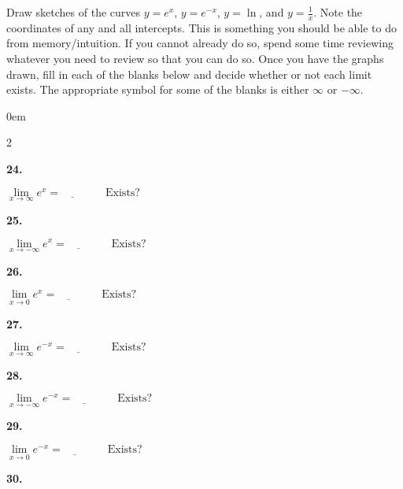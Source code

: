 \documentclass[12pt,]{book}
\theoremstyle{plain}
\theoremstyle{definition}
\numberwithin{equation}{section}
\newenvironment{exercisegroup}%
{\medskip\noindent}%
{\par\bigskip}%
\newlength{\exercisegroupindent}%
\newlength{\exercisegroupitemwidth}%
\newenvironment{exercisegrouplist}%
{\vspace{-\partopsep}%
\begin{adjustwidth}{\exercisegroupindent}{0em}}%
{\end{adjustwidth}%
\vspace{-\partopsep}%
\vspace{\baselineskip}}%
\newenvironment{exercisegroupbycol}[1]%
{\begin{exercisegrouplist}%
\vspace{-\multicolsep}%
\begin{multicols}{#1}%
\setlength{\parindent}{0em}%
\setlength{\exercisegroupitemwidth}{\linewidth}}%
{\end{multicols}%
\vspace{-\multicolsep}%
\end{exercisegrouplist}}%
\newenvironment{exercisegroupitem}[1]%
{\begin{minipage}[t]{\exercisegroupitemwidth}
\vspace{0pt}%
{\bfseries#1}%
\rule{0pt}{\baselineskip}}{\strut%
\end{minipage}%
\hspace{\columnsep}}%
\providecommand\phantomsection{}
\newcommand{\fe}[2]{\mathop{{#1}{\left(#2\right)}}}
\begin{document}
\begin{exercisegroup}%
Draw sketches of the curves \(y=e^x\), \(y=e^{-x}\), \(y=\fe{\ln}{x}\), and \(y=\frac{1}{x}\).  Note the coordinates of any and all intercepts.  This is something you should be able to do from memory/intuition.  If you cannot already do so, spend some time reviewing whatever you need to review so that you can do so. Once you have the graphs drawn, fill in each of the blanks below and decide whether or not each limit exists.  The appropriate symbol for some of the blanks is either \(\infty\) or \(-\infty\).%
\par
\begin{exercisegroupbycol}{2}%
\begin{exercisegroupitem}{24. }\phantomsection\hypertarget{exercise-161}{\null}
\(\lim\limits_{x\to\infty}e^x=\underline{\qquad}\qquad\text{Exists?}\)%
\end{exercisegroupitem}%
\par%
\begin{exercisegroupitem}{25. }\phantomsection\hypertarget{exercise-162}{\null}
\(\lim\limits_{x\to-\infty}e^x=\underline{\qquad}\qquad\text{Exists?}\)%
\end{exercisegroupitem}%
\par%
\begin{exercisegroupitem}{26. }\phantomsection\hypertarget{exercise-163}{\null}
\(\lim\limits_{x\to0}e^x=\underline{\qquad}\qquad\text{Exists?}\)%
\end{exercisegroupitem}%
\par%
\begin{exercisegroupitem}{27. }\phantomsection\hypertarget{exercise-164}{\null}
\(\lim\limits_{x\to\infty}e^{-x}=\underline{\qquad}\qquad\text{Exists?}\)%
\end{exercisegroupitem}%
\par%
\begin{exercisegroupitem}{28. }\phantomsection\hypertarget{exercise-165}{\null}
\(\lim\limits_{x\to-\infty}e^{-x}=\underline{\qquad}\qquad\text{Exists?}\)%
\end{exercisegroupitem}%
\par%
\begin{exercisegroupitem}{29. }\phantomsection\hypertarget{exercise-166}{\null}
\(\lim\limits_{x\to0}e^{-x}=\underline{\qquad}\qquad\text{Exists?}\)%
\end{exercisegroupitem}%
\par%
\begin{exercisegroupitem}{30. }\phantomsection\hypertarget{exercise-167}{\null}

\end{exercisegroupitem}
\end{exercisegroupbycol}
\end{exercisegroup}
\end{document}
